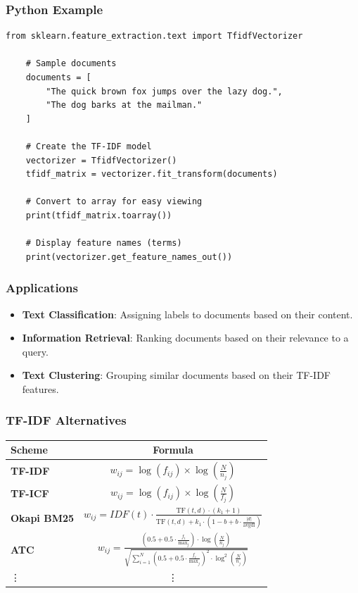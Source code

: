 \documentclass{beamer}
\begin{document}
\begin{frame}[fragile]
    \frametitle{Python Example}
    \begin{lstlisting}[style=pythonStyle, caption=TF-IDF Example in Python]
    from sklearn.feature_extraction.text import TfidfVectorizer

    # Sample documents
    documents = [
        "The quick brown fox jumps over the lazy dog.",
        "The dog barks at the mailman."
    ]

    # Create the TF-IDF model
    vectorizer = TfidfVectorizer()
    tfidf_matrix = vectorizer.fit_transform(documents)

    # Convert to array for easy viewing
    print(tfidf_matrix.toarray())

    # Display feature names (terms)
    print(vectorizer.get_feature_names_out())
    \end{lstlisting}
\end{frame}

\begin{frame}
    \frametitle{Applications}
    \begin{itemize}
        \item \textbf{Text Classification}: Assigning labels to documents based on their content.
        \item \textbf{Information Retrieval}: Ranking documents based on their relevance to a query.
        \item \textbf{Text Clustering}: Grouping similar documents based on their TF-IDF features.
    \end{itemize}
\end{frame}

\begin{frame}
\frametitle{TF-IDF Alternatives}
\centering
\begin{tabular}{|l|c|}
\hline
\textbf{Scheme} & \textbf{Formula} \\ \hline
\textbf{TF-IDF} & $w_{ij} = \log(f_{ij}) \times \log\left(\frac{N}{n_j}\right)$ \\ \hline
\textbf{TF-ICF} & $w_{ij} = \log(f_{ij}) \times \log\left(\frac{N}{f_j}\right)$ \\ \hline
\textbf{Okapi BM25} & $w_{ij} = IDF(t) \cdot \frac{\text{TF}(t,d) \cdot (k_1 + 1)}{\text{TF}(t,d) + k_1 \cdot \left(1 - b + b \cdot \frac{|d|}{\text{avgdl}}\right)}$ \\ \hline
\textbf{ATC} & $w_{ij} = \frac{\left(0.5 + 0.5 \cdot \frac{f_i}{\max_j}\right) \cdot \log\left(\frac{N}{n_j}\right)}{\sqrt{\sum_{i=1}^{N} \left(0.5 + 0.5 \cdot \frac{f_i}{\max_j}\right)^2 \cdot \log^2\left(\frac{N}{n_j}\right)}}$ \\ \hline
\vdots & \vdots \\ \hline
\end{tabular}
\end{frame}
\end{document}
